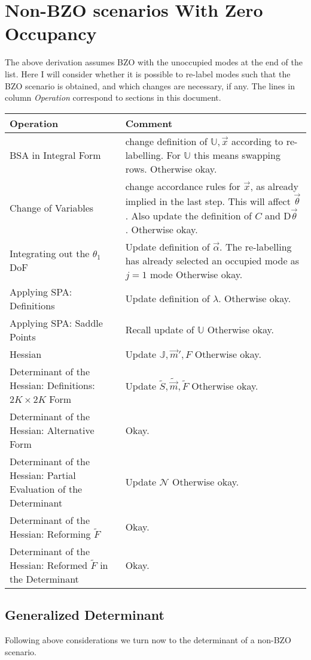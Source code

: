 \documentclass[
	english,
	a4paper,
	fontsize=10pt,
	parskip=half,
	titlepage=true,
	DIV=12,
	final
]{scrreprt}
\newcommand*{\tabcrlf}{\\ \hline}			%
\newcommand*{\DD}[1]{\ensuremath{\text{D}\vec{#1}\;}}
\begin{document}
\section{Non-BZO scenarios With Zero Occupancy}
The above derivation assumes BZO with the unoccupied modes at the end of the list.
Here I will consider whether it is possible to re-label modes such that the BZO scenario is obtained, and which changes are necessary, if any. The lines in column \emph{Operation} correspond to sections in this document.
\begin{tabularx}
	{\linewidth}
	{p{.30\linewidth}
	 p{.65\linewidth}}
	\textbf{Operation} & \textbf{Comment} \tabcrlf
	
	BSA in Integral Form &
		change definition of $\mathbb{U}, \vec{x}$ according to re-labelling.
		For $\mathbb{U}$ this means swapping rows. \newline
		Otherwise okay.
	\tabcrlf
	Change of Variables &
		change accordance rules for $\vec{x}$, as already implied in the last step. This will affect 
		$\vec{\theta}$. Also update the definition of $C$ and $\DD{\theta}$. \newline
		Otherwise okay.
	\tabcrlf
	Integrating out the $\theta_1$ DoF &
		Update definition of $\vec{\alpha}$. The re-labelling has already selected an occupied mode as
		$j=1$ mode \newline
		Otherwise okay.
	\tabcrlf
	Applying SPA: Definitions &
		Update definition of $\lambda$. \newline
		Otherwise okay.
	\tabcrlf
	Applying SPA: Saddle Points &
		Recall update of $\mathbb{U}$ \newline
		Otherwise okay.
	\tabcrlf
	Hessian &
		Update $\mathbb{J}, \vec{m}', F$ \newline
		Otherwise okay.
	\tabcrlf
	Determinant of the Hessian: Definitions: $2K \times 2K$ Form &
		Update $\tilde{S}, \tilde{\vec{m}}, \tilde{F}$ \newline
		Otherwise okay.
	\tabcrlf
	Determinant of the Hessian: Alternative Form &
		Okay.
	\tabcrlf
	Determinant of the Hessian: Partial Evaluation of the Determinant &
		Update $\mathcal{N}$ \newline
		Otherwise okay.
	\tabcrlf
	Determinant of the Hessian: Reforming $\tilde{F}$ &
		Okay.
	\tabcrlf
	Determinant of the Hessian: Reformed $\tilde{F}$ in the Determinant &
		Okay.
\end{tabularx}

\subsection{Generalized Determinant}
Following above considerations we turn now to the determinant of a non-BZO scenario.
\end{document}
